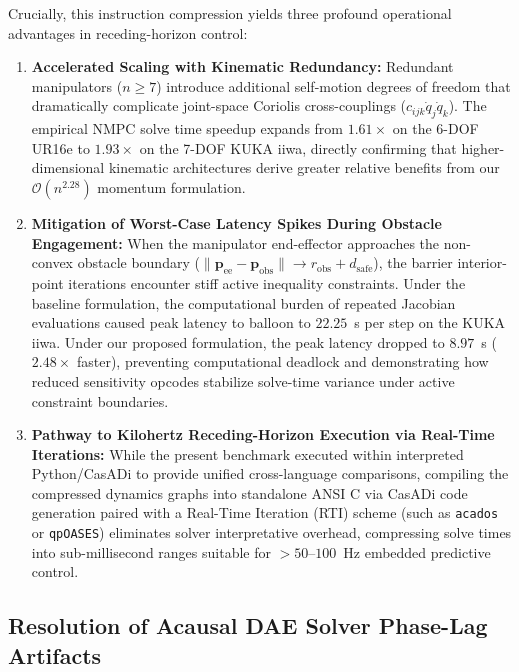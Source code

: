 \documentclass[fleqn,10pt]{article}
\begin{document}
	Crucially, this instruction compression yields three profound operational advantages in receding-horizon control:
	\begin{enumerate}
		\item \textbf{Accelerated Scaling with Kinematic Redundancy:} Redundant manipulators ($n \ge 7$) introduce additional self-motion degrees of freedom that dramatically complicate joint-space Coriolis cross-couplings ($c_{ijk}\dot{q}_j\dot{q}_k$). The empirical NMPC solve time speedup expands from $1.61\times$ on the 6-DOF UR16e to $1.93\times$ on the 7-DOF KUKA iiwa, directly confirming that higher-dimensional kinematic architectures derive greater relative benefits from our $\mathcal{O}(n^{2.28})$ momentum formulation.
		\item \textbf{Mitigation of Worst-Case Latency Spikes During Obstacle Engagement:} When the manipulator end-effector approaches the non-convex obstacle boundary ($\|\bm{p}_{\text{ee}} - \bm{p}_{\text{obs}}\| \to r_{\text{obs}} + d_{\text{safe}}$), the barrier interior-point iterations encounter stiff active inequality constraints. Under the baseline formulation, the computational burden of repeated Jacobian evaluations caused peak latency to balloon to $22.25$~s per step on the KUKA iiwa. Under our proposed formulation, the peak latency dropped to $8.97$~s ($2.48\times$ faster), preventing computational deadlock and demonstrating how reduced sensitivity opcodes stabilize solve-time variance under active constraint boundaries.
		\item \textbf{Pathway to Kilohertz Receding-Horizon Execution via Real-Time Iterations:} While the present benchmark executed within interpreted Python/CasADi to provide unified cross-language comparisons, compiling the compressed dynamics graphs into standalone ANSI C via CasADi code generation paired with a Real-Time Iteration (RTI) scheme (such as \texttt{acados} or \texttt{qpOASES}) eliminates solver interpretative overhead, compressing solve times into sub-millisecond ranges suitable for $>50$--$100$~Hz embedded predictive control.
	\end{enumerate}
	
	\subsection*{Resolution of Acausal DAE Solver Phase-Lag Artifacts}
	
\end{document}
